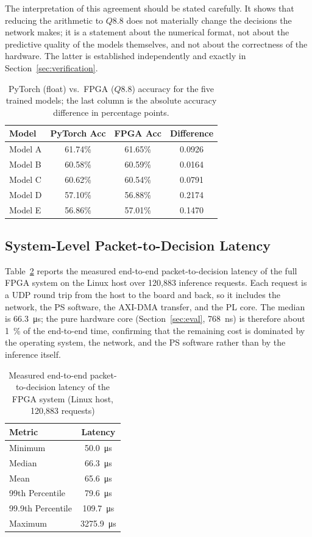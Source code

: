 \documentclass[final,5p,times,twocolumn]{elsarticle}
\begin{document}
The interpretation of this agreement should be stated carefully. It shows that
reducing the arithmetic to $Q8.8$ does not materially change the decisions the
network makes; it is a statement about the numerical format, not about the
predictive quality of the models themselves, and not about the correctness of
the hardware. The latter is established independently and exactly in
Section~\ref{sec:verification}.

\begin{table}[htbp]
\centering
\caption{PyTorch (float) vs.\ FPGA ($Q8.8$) accuracy for the five trained
models; the last column is the absolute accuracy difference in percentage
points.}
\label{tab:model_performance}
\begin{tabular}{lccc}
\toprule
Model & PyTorch Acc & FPGA Acc & Difference \\
\midrule
Model A & 61.74\% & 61.65\% & 0.0926 \\
Model B & 60.58\% & 60.59\% & 0.0164 \\
Model C & 60.62\% & 60.54\% & 0.0791 \\
Model D & 57.10\% & 56.88\% & 0.2174 \\
Model E & 56.86\% & 57.01\% & 0.1470 \\
\bottomrule
\end{tabular}
\end{table}

\subsection{System-Level Packet-to-Decision Latency}
Table~\ref{tab:latency_metrics} reports the measured end-to-end
packet-to-decision latency of the full FPGA system on the Linux host over
120{,}883 inference requests. Each request is a UDP round trip from the host to
the board and back, so it includes the network, the PS software, the AXI-DMA
transfer, and the PL core. The median is \SI{66.3}{\micro\second}; the pure
hardware core (Section~\ref{sec:eval}, \SI{768}{\nano\second}) is therefore
about \SI{1}{\percent} of the end-to-end time, confirming that the remaining
cost is dominated by the operating system, the network, and the PS software
rather than by the inference itself.

\begin{table}[htbp]
\centering
\caption{Measured end-to-end packet-to-decision latency of the FPGA system
(Linux host, 120{,}883 requests)}
\label{tab:latency_metrics}
\begin{tabular}{lc}
\toprule
Metric & Latency \\
\midrule
Minimum & \SI{50.0}{\micro\second} \\
Median & \SI{66.3}{\micro\second} \\
Mean & \SI{65.6}{\micro\second} \\
99th Percentile & \SI{79.6}{\micro\second} \\
99.9th Percentile & \SI{109.7}{\micro\second} \\
Maximum & \SI{3275.9}{\micro\second} \\
\bottomrule
\end{tabular}
\end{table}
\end{document}
